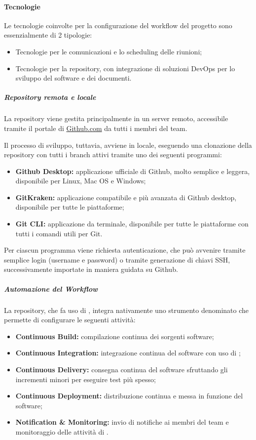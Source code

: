 	\paragraph{Tecnologie}

	Le tecnologie coinvolte per la configurazione del workflow del progetto sono essenzialmente di 2 tipologie:
	\begin{itemize}
		\item Tecnologie per le comunicazioni e lo scheduling delle riunioni;
		\item Tecnologie per la repository, con integrazione di soluzioni DevOps per lo sviluppo del software e dei documenti.
	\end{itemize}

		\subparagraph{Repository remota e locale}

		La repository viene gestita principalmente in un server remoto, accessibile tramite il portale di \href{https://github.com}{Github.com} da tutti i membri del team.

		Il processo di sviluppo, tuttavia, avviene in locale, eseguendo una clonazione della repository con tutti i branch attivi tramite uno dei seguenti programmi:

		\begin{itemize}
			\item \textbf{Github Desktop:} applicazione ufficiale di Github, molto semplice e leggera, disponibile per Linux, Mac OS e Windows;
			\item \textbf{GitKraken:} applicazione compatibile e più avanzata di Github desktop, disponibile per tutte le piattaforme;
			\item \textbf{Git CLI:} applicazione da terminale, disponibile per tutte le piattaforme con tutti i comandi utili per Git.
		\end{itemize}

		Per ciascun programma viene richiesta autenticazione, che può avvenire tramite semplice login (username e password) o tramite generazione di chiavi SSH, successivamente importate in maniera guidata su Github.

		\subparagraph{Automazione del Workflow}

		La repository, che fa uso di , integra nativamente uno strumento denominato  che permette di configurare le seguenti attività:
		\begin{itemize}
			\item \textbf{Continuous Build:} compilazione continua dei sorgenti software;
			\item \textbf{Continuous Integration:} integrazione continua del software con uso di ;
			\item \textbf{Continuous Delivery:} consegna continua del software sfruttando gli incrementi minori per eseguire test più spesso;
			\item \textbf{Continuous Deployment:} distribuzione continua e messa in funzione del software;
			\item \textbf{Notification \& Monitoring:} invio di notifiche ai membri del team e monitoraggio delle attività di .
		\end{itemize}

